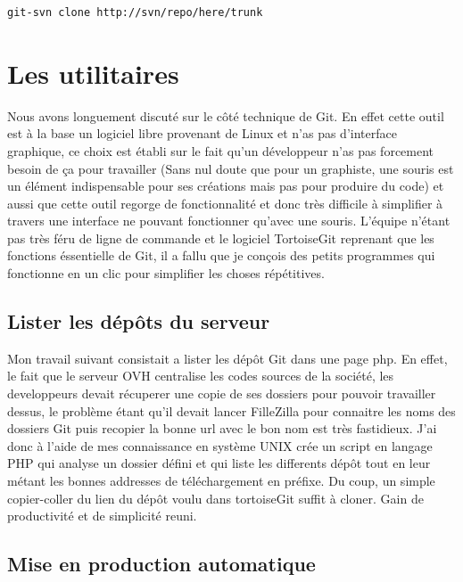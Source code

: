 \begin{lstlisting}
git-svn clone http://svn/repo/here/trunk
\end{lstlisting}

\section{Les utilitaires} %

Nous avons longuement discuté sur le côté technique de Git. En effet cette
outil est à la base un logiciel libre provenant de Linux et n'as pas
d'interface graphique, ce choix est établi sur le fait qu'un développeur n'as
pas forcement besoin de ça pour travailler (Sans nul doute que pour un
graphiste, une souris est un élément indispensable pour ses créations mais pas
pour produire du code) et aussi que cette outil regorge de fonctionnalité et
donc très difficile à simplifier à travers une interface ne pouvant fonctionner
qu'avec une souris. L'équipe n'étant pas très féru de ligne de commande et le
logiciel TortoiseGit reprenant que les fonctions éssentielle de Git, il a fallu
que je conçois des petits programmes qui fonctionne en un clic pour simplifier
les choses répétitives.


\subsection{Lister les dépôts du serveur}

Mon travail suivant consistait a lister les dépôt Git dans une page php. En
effet, le fait que le serveur OVH centralise les codes sources de la société,
les developpeurs devait récuperer une copie de ses dossiers pour pouvoir
travailler dessus, le problème étant qu'il devait lancer FilleZilla pour
connaitre les noms des dossiers Git puis recopier la bonne url avec le bon nom
est très fastidieux. J'ai donc à l'aide de mes connaissance en système UNIX
crée un script en langage PHP qui analyse un dossier défini et qui liste les
differents dépôt tout en leur métant les bonnes addresses de téléchargement en
préfixe. Du coup, un simple copier-coller du lien du dépôt voulu dans
tortoiseGit suffit à cloner. Gain de productivité et de simplicité reuni.



\subsection{Mise en production automatique} %

